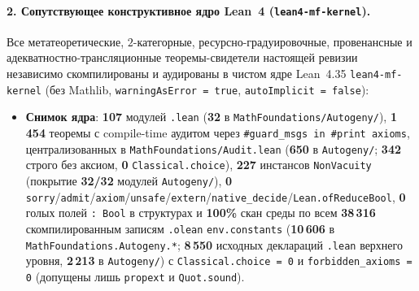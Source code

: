 \documentclass[11pt]{article}
\theoremstyle{plain}
\theoremstyle{definition}
\begin{document}
\paragraph{2. Сопутствующее конструктивное ядро Lean~4 (\texttt{lean4-mf-kernel}).}
Все метатеоретические, $2$-категорные, ресурсно-градуировочные, провенансные и адекватностно-трансляционные теоремы-свидетели настоящей ревизии независимо скомпилированы и аудированы в чистом ядре Lean~4.35 \texttt{lean4-mf-kernel} (без Mathlib, \texttt{warningAsError = true}, \texttt{autoImplicit = false}):
\begin{itemize}[nosep]
\item \textbf{Снимок ядра}: \textbf{107} модулей \texttt{.lean} (\textbf{32} в \texttt{MathFoundations/\allowbreak Autogeny/}), \textbf{1\,454} теоремы с compile-time аудитом через \texttt{\#guard\_msgs in \#print axioms}, централизованных в \texttt{MathFoundations/\allowbreak Audit.lean} (\textbf{650} в \texttt{Autogeny/}; \textbf{342} строго без аксиом, \textbf{0} \texttt{Classical.choice}), \textbf{227} инстансов \texttt{NonVacuity} (покрытие \textbf{32/32} модулей \texttt{Autogeny/}), \textbf{0} \texttt{sorry}/\texttt{admit}/\texttt{axiom}/\texttt{unsafe}/\texttt{extern}/\texttt{native\_decide}/\texttt{Lean.ofReduceBool}, \textbf{0} голых полей \texttt{: Bool} в структурах и \textbf{100\%} скан среды по всем \textbf{38\,316} скомпилированным записям \texttt{.olean} \texttt{env.constants} (\textbf{10\,606} в \texttt{MathFoundations.\allowbreak Autogeny.*}; \textbf{8\,550} исходных деклараций \texttt{.lean} верхнего уровня, \textbf{2\,213} в \texttt{Autogeny/}) с \texttt{Classical.choice = 0} и \texttt{forbidden\_axioms = 0} (допущены лишь \texttt{propext} и \texttt{Quot.sound}).

\end{itemize}
\end{document}
